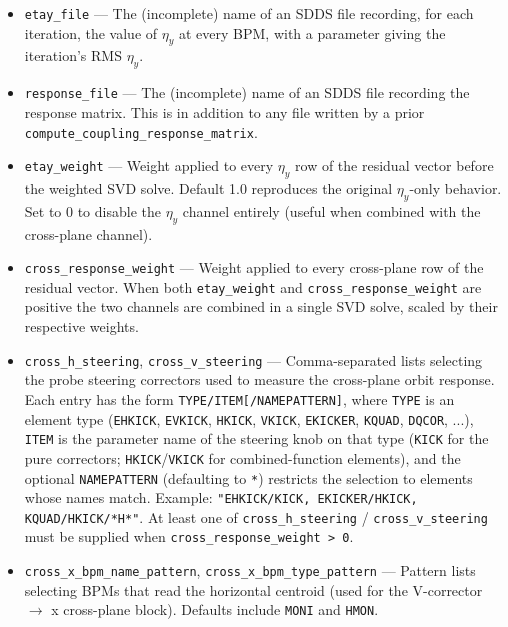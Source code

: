 \documentclass[11pt]{article}
\begin{document}
\begin{itemize}
  \verb|s|, \verb|ElementParameter|, \verb|PreviousParameterValue|,
  \verb|DeltaParameterValue|, \verb|ParameterValue|; the parameters include
  \verb|Iteration| and a \verb|Stage| string that is \verb|"uncorrected"|
  for all but the actually-final iteration of the call (which is tagged
  \verb|"corrected"|).
\item \verb|etay_file| --- The (incomplete) name of an SDDS file recording,
  for each iteration, the value of $\eta_y$ at every BPM, with a parameter
  giving the iteration's RMS $\eta_y$.
\item \verb|response_file| --- The (incomplete) name of an SDDS file
  recording the response matrix.  This is in addition to any file written
  by a prior \verb|compute_coupling_response_matrix|.
\item \verb|etay_weight| --- Weight applied to every $\eta_y$ row of the
  residual vector before the weighted SVD solve.  Default 1.0 reproduces
  the original $\eta_y$-only behavior.  Set to 0 to disable the $\eta_y$
  channel entirely (useful when combined with the cross-plane channel).
\item \verb|cross_response_weight| --- Weight applied to every cross-plane
  row of the residual vector.   When both \verb|etay_weight| and
  \verb|cross_response_weight| are positive the two channels are combined
  in a single SVD solve, scaled by their respective weights.
\item \verb|cross_h_steering|, \verb|cross_v_steering| --- Comma-separated
  lists selecting the probe steering correctors used to measure the
  cross-plane orbit response.  Each entry has the form
  \verb|TYPE/ITEM[/NAMEPATTERN]|, where \verb|TYPE| is an element type
  (\verb|EHKICK|, \verb|EVKICK|, \verb|HKICK|, \verb|VKICK|,
  \verb|EKICKER|, \verb|KQUAD|, \verb|DQCOR|, ...), \verb|ITEM| is the
  parameter name of the steering knob on that type (\verb|KICK| for the
  pure correctors; \verb|HKICK|/\verb|VKICK| for combined-function
  elements), and the optional \verb|NAMEPATTERN| (defaulting to \verb|*|)
  restricts the selection to elements whose names match.  Example:
  \verb|"EHKICK/KICK, EKICKER/HKICK, KQUAD/HKICK/*H*"|.  At least one of
  \verb|cross_h_steering| / \verb|cross_v_steering| must be supplied when
  \verb|cross_response_weight > 0|.
\item \verb|cross_x_bpm_name_pattern|, \verb|cross_x_bpm_type_pattern| ---
  Pattern lists selecting BPMs that read the horizontal centroid (used for
  the V-corrector $\to$ x cross-plane block).  Defaults include \verb|MONI|
  and \verb|HMON|.

\end{itemize}
\end{document}
